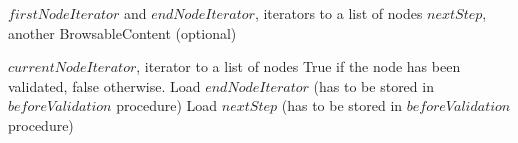 \begin{algorithm}[H]
\caption{}
\begin{algorithmic}
\REQUIRE $firstNodeIterator$ and $endNodeIterator$, iterators to a list of nodes
\REQUIRE $nextStep$, another BrowsableContent (optional)
\STATE {}
\RETURN \browseDown
\end{algorithmic}
\end{algorithm}

\begin{algorithm}[H]
\caption{}
\begin{algorithmic}
\REQUIRE $currentNodeIterator$, iterator to a list of nodes
\ENSURE True if the node has been validated, false otherwise.
\STATE Load $endNodeIterator$ (has to be stored in $beforeValidation$ procedure)
\STATE Load $nextStep$ (has to be stored in $beforeValidation$ procedure)
\IF{\browseDown}
\STATE {}
\RETURN \TRUE
\ELSIF{\browseUp}
\STATE {}
\RETURN \TRUE
\ELSE
\STATE {}
\RETURN \FALSE
\ENDIF
\end{algorithmic}
\end{algorithm}
